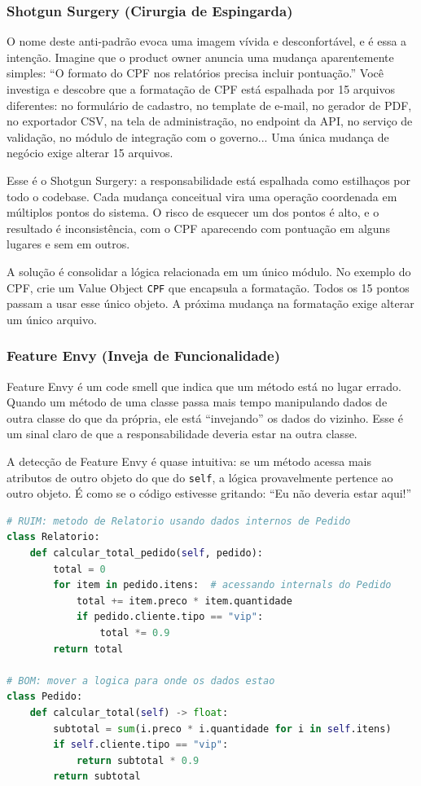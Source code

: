 \subsubsection{Shotgun Surgery (Cirurgia de Espingarda)}

O nome deste anti-padrão evoca uma imagem vívida e desconfortável, e é
essa a intenção. Imagine que o product owner anuncia uma mudança
aparentemente simples: ``O formato do CPF nos relatórios precisa incluir
pontuação.'' Você investiga e descobre que a formatação de CPF está
espalhada por 15 arquivos diferentes: no formulário de cadastro, no
template de e-mail, no gerador de PDF, no exportador CSV, na tela de
administração, no endpoint da API, no serviço de validação, no módulo
de integração com o governo... Uma única mudança de negócio exige alterar
15 arquivos.

Esse é o Shotgun Surgery: a responsabilidade está espalhada como estilhaços
por todo o codebase. Cada mudança conceitual vira uma operação coordenada
em múltiplos pontos do sistema. O risco de esquecer um dos pontos é alto,
e o resultado é inconsistência, com o CPF aparecendo com pontuação em alguns
lugares e sem em outros.

A solução é consolidar a lógica relacionada em um único módulo. No exemplo
do CPF, crie um Value Object \texttt{CPF} que encapsula a formatação. Todos
os 15 pontos passam a usar esse único objeto. A próxima mudança na
formatação exige alterar um único arquivo.

\subsubsection{Feature Envy (Inveja de Funcionalidade)}

Feature Envy é um code smell que indica que um método está no lugar errado.
Quando um método de uma classe passa mais tempo manipulando dados de outra
classe do que da própria, ele está ``invejando'' os dados do vizinho. Esse
é um sinal claro de que a responsabilidade deveria estar na outra classe.

A detecção de Feature Envy é quase intuitiva: se um método acessa mais
atributos de outro objeto do que do \texttt{self}, a lógica provavelmente
pertence ao outro objeto. É como se o código estivesse gritando: ``Eu não
deveria estar aqui!''

\begin{lstlisting}[language=Python, caption={Code Smell: Feature Envy}]
# RUIM: metodo de Relatorio usando dados internos de Pedido
class Relatorio:
    def calcular_total_pedido(self, pedido):
        total = 0
        for item in pedido.itens:  # acessando internals do Pedido
            total += item.preco * item.quantidade
            if pedido.cliente.tipo == "vip":
                total *= 0.9
        return total

# BOM: mover a logica para onde os dados estao
class Pedido:
    def calcular_total(self) -> float:
        subtotal = sum(i.preco * i.quantidade for i in self.itens)
        if self.cliente.tipo == "vip":
            return subtotal * 0.9
        return subtotal
\end{lstlisting}

